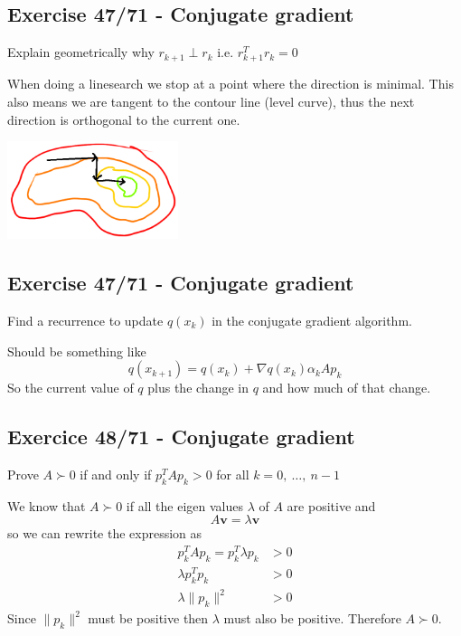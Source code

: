 \subsection{Exercise 47/71 - Conjugate gradient}

Explain geometrically why $r_{k+1} \perp r_k$ i.e. $r_{k+1}^T r_k = 0$

\answer

When doing a linesearch we stop at a point where the direction is minimal. This also means we are tangent to the contour line (level curve), thus the next direction is orthogonal to the current one.

\begin{center}
	\includegraphics[width=5cm]{fig/unconstrained/47_71.png}
\end{center}


\subsection{Exercise 47/71 - Conjugate gradient}

Find a recurrence to update $q(x_k)$ in the conjugate gradient algorithm.

\answer

Should be something like 
\[
	q(x_{k+1}) = q(x_k) + \nabla q(x_k) \alpha_k A p_k
\]
So the current value of $q$ plus the change in $q$ and how much of that change.

\incomplete

\subsection{Exercice 48/71 - Conjugate gradient}
Prove $A \succ 0$ if and only if $p_k^T A p_k > 0$ for all $k = 0,\ \ldots,\ n-1$

\answer

We know that $A \succ 0$ if all the eigen values $\lambda$ of $A$ are positive and
\[
	A \textbf{v} = \lambda \textbf{v}
\]
so we can rewrite the expression as
\begin{align*}
	p_k^T A p_k = p_k^T \lambda p_k &> 0 \\
	\lambda p_k^T p_k &> 0 \\
	\lambda \| p_k \|^2 &> 0 
\end{align*}
Since $\| p_k \|^2$ must be positive then $\lambda$ must also be positive. Therefore $A \succ 0$.











